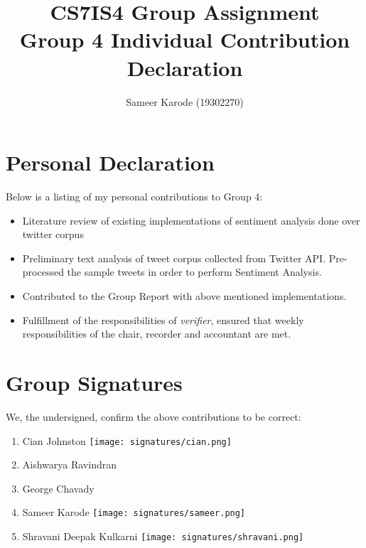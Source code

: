 \documentclass[a4paper,10pt]{article}
\begin{document}
\title{
    CS7IS4 Group Assignment \\
    \large Group 4 Individual Contribution Declaration
}
\author{
    Sameer Karode (19302270)
}

\maketitle

\section{Personal Declaration}

Below is a listing of my personal contributions to Group 4:

\begin{itemize}
    \item {Literature review of existing implementations of sentiment analysis done over twitter corpus}
    \item{
        Preliminary text analysis of tweet corpus collected from Twitter API. Pre-processed the sample tweets in order to perform Sentiment Analysis.
    }
    \item{
       Contributed to the Group Report with above mentioned implementations.
    }
    \item{
        Fulfillment of the responsibilities of \textit{verifier}, ensured that weekly responsibilities of the chair, recorder and accountant are met.
    }
\end{itemize}

\section{Group Signatures}

We, the undersigned, confirm the above contributions to be correct:

\begin{enumerate}
    \item{
        Cian Johnston \texttt{[image: signatures/cian.png]}
    }
    \item{
        Aishwarya Ravindran
    }
    \item{
        George Chavady
    }
    \item{
        Sameer Karode \texttt{[image: signatures/sameer.png]}
    }
    \item{
        Shravani Deepak Kulkarni \texttt{[image: signatures/shravani.png]}
    }

\end{enumerate}
\end{document}

